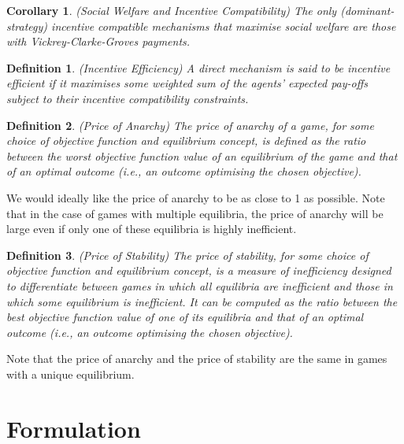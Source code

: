\documentclass{article}
\newtheorem{definition}{Definition}
\newtheorem{corollary}{Corollary}
\begin{document}
\begin{corollary}
(Social Welfare and Incentive Compatibility) The only (dominant-strategy) incentive compatible mechanisms that maximise social welfare are those with Vickrey-Clarke-Groves payments.
\end{corollary}

\begin{definition}
(Incentive Efficiency) A direct mechanism is said to be incentive efficient if it maximises some weighted sum of the agents' expected pay-offs subject to their incentive compatibility constraints.
\end{definition}

\begin{definition}
(Price of Anarchy) The price of anarchy of a game, for some choice of objective function and equilibrium concept, is defined as the ratio between the worst objective function value of an equilibrium of the game and that of an optimal outcome (i.e., an outcome optimising the chosen objective).
\end{definition}

We would ideally like the price of anarchy to be as close to 1 as possible. Note that in the case of games with multiple equilibria, the price of anarchy will be large even if only one of these equilibria is highly inefficient. 

\begin{definition}
(Price of Stability) The price of stability, for some choice of objective function and equilibrium concept, is a measure of inefficiency designed to differentiate between games in which all equilibria are inefficient and those in which some equilibrium is inefficient. It can be computed as the ratio between the best objective function value of one of its equilibria and that of an optimal outcome (i.e., an outcome optimising the chosen objective).
\end{definition}

Note that the price of anarchy and the price of stability are the same in games with a unique equilibrium.

\section{Formulation}
\end{document}
